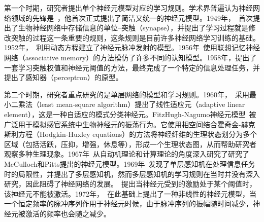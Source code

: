 第一个时期，研究者提出单个神经元模型对应的学习规则。学术界普遍认为神经网络领域的先锋是~\citet{mcculloch1943logical}，他首次正式提出了简洁又统一的神经元模型。1949年，~\citet{hebb1963organizations, gerstner2002mathematical}首次提出了生物神经网络中存储信息的单位--突触（synapse），并提出了学习过程就是修改突触的过程这一条重要的规则，这条规则是目前许多神经网络学习训练的基础。1952年，~\citet{hodgkin1952quantitative}利用动态方程建立了神经元脉冲发射的模型。1956年~\citet{taylor1956electrical}使用联想记忆神经网络（associative memory）的方法模仿了许多不同的认知模型。1958年，\citet{rosenblatt1958perceptron}提出了一套学习突触权值和神经元阈值的方法，最终完成了一个特定的信息处理任务，并提出了感知器（perceptron）的原型。

第二个时期，研究者重点研究的是单层网络的模型和学习规则。1960年，~\citet{widrow1960adaptive}采用最小二乘法（least mean-square algorithm）提出了线性适应元（adaptive linear element），这是一种自适应的模式分类神经元。FitzHugh-Nagumo神经元模型~\cite{fitzhugh1961impulses}被广泛用于模拟感官系统中生物神经元的振荡行为。它使用相空间结合霍奇金-赫克斯利方程（Hodgkin-Huxley equations）的方法将神经纤维的生理状态划分为多个区域（包括活跃，压抑，增强，休息等），形成一个生理状态图，从而帮助研究者观察多种生理现象。1967年~\citet{minsky1967computation}从自动机理论和计算理论的角度深入研究了研究了McCulloch和Pitts提出的神经元模型。1969年~\citet{minsky1969perceptron}发现了单层感知机在处理信息任务时的局限性，并提出了多层感知机，然而多层感知机的学习规则在当时并没有深入研究，因此阻碍了神经网络的发展。~\citet{cainiello1961outline}提出当神经元受到的激励处于某个阈值时，该神经元不能被激活。1972年，~\citet{nagumo1972response}在此基础上提出了一种非线性的神经元模型，当一个恒定频率的脉冲序列作用于神经元时候，由于脉冲序列的振幅随时间减少，神经元被激活的频率也会随之减少。

